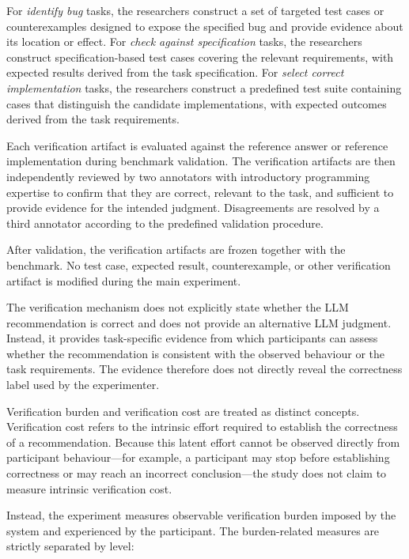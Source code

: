 \documentclass[oneside,final,14pt,a4paper]{extreport}
\begin{document}
For \emph{identify bug} tasks, the researchers construct a set of targeted 
test cases or counterexamples designed to expose the specified bug and provide 
evidence about its location or effect. For \emph{check against specification} 
tasks, the researchers construct specification-based test cases covering the 
relevant requirements, with expected results derived from the task 
specification. For \emph{select correct implementation} tasks, the 
researchers construct a predefined test suite containing cases that 
distinguish the candidate implementations, with expected outcomes derived 
from the task requirements.

Each verification artifact is evaluated against the reference answer or 
reference implementation during benchmark validation. The verification 
artifacts are then independently reviewed by two annotators with introductory 
programming expertise to confirm that they are correct, relevant to the task, 
and sufficient to provide evidence for the intended judgment. Disagreements 
are resolved by a third annotator according to the predefined validation 
procedure.

After validation, the verification artifacts are frozen together with the 
benchmark. No test case, expected result, counterexample, or other verification 
artifact is modified during the main experiment.

The verification mechanism does not explicitly state whether the LLM recommendation 
is correct and does not provide an alternative LLM judgment. Instead, 
it provides task-specific evidence from which participants can assess 
whether the recommendation is consistent with the observed behaviour 
or the task requirements. The evidence therefore does not directly 
reveal the correctness label used by the experimenter.

Verification burden and verification cost are treated as distinct concepts. 
Verification cost refers to the intrinsic effort required to establish the 
correctness of a recommendation. Because this latent effort cannot be observed 
directly from participant behaviour---for example, a participant may stop 
before establishing correctness or may reach an incorrect conclusion---the 
study does not claim to measure intrinsic verification cost.

Instead, the experiment measures observable verification burden imposed by 
the system and experienced by the participant. The burden-related measures
are strictly separated by level:
\end{document}
